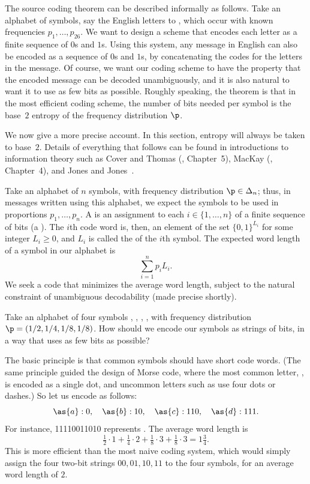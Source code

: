 The source%
% 
% 
coding theorem can be described informally as follows.  Take an alphabet of
symbols, say the English%
%
% 
letters  to , which occur with known frequencies $p_1, \ldots,
p_{26}$.  We want to design a scheme that encodes each letter as a finite
sequence of $0$s and $1$s.  Using this system, any message in English can
also be encoded as a sequence of $0$s and $1$s, by concatenating the codes
for the letters in the message.  Of course, we want our coding scheme to
have the property that the encoded message can be decoded unambiguously,
and it is also natural to want it to use as few bits as possible.  Roughly
speaking, the theorem is that in the most efficient coding scheme, the
number of bits needed per symbol is the base~$2$ entropy of the frequency
distribution $\p$.

We now give a more precise account.  In this section, entropy will always
be taken to base~$2$.  Details of everything that follows can be found in
introductions to information theory such as Cover and Thomas (\cite{CoTh1},
Chapter~5), MacKay (\cite{MacKITI}, Chapter~4), and Jones and
Jones~\cite{JoJo}.

Take an alphabet of $n$ symbols, with frequency distribution $\p \in
\Delta_n$; thus, in messages written using this alphabet, we expect the
symbols to be used in proportions $p_1, \ldots, p_n$.  A
 is an assignment to each $i \in \{1, \ldots, n\}$
of a finite sequence of bits (a ).  The $i$th code word
is, then, an element of the set $\{0, 1\}^{L_i}$ for some integer $L_i \geq
0$, and $L_i$ is called the  of the $i$th symbol.  The expected word length of a symbol in our
alphabet is
\[
\sum_{i = 1}^n p_i L_i.
\]
We seek a code that minimizes the average word length, subject to the
natural constraint of unambiguous decodability (made precise shortly).

\begin{example}
Take an alphabet of four symbols , , , , with
frequency distribution $\p = (1/2, 1/4, 1/8, 1/8)$.  How should we encode
our symbols as strings of bits, in a way that uses as few bits as possible?

The basic principle is that common symbols should have short code words.
(The same principle guided the design of Morse%
%
% 
code, where the most common letter, , is encoded as a single dot, and
uncommon letters such as  use four dots or dashes.)  So let us encode
as follows:
\[
\as{a}: 0,
\quad
\as{b}: 10,
\quad
\as{c}: 110,
\quad
\as{d}: 111.
\]
For instance, 11110011010 represents .  The average word length
is
\[
\tfrac{1}{2} \cdot 1 +
\tfrac{1}{4} \cdot 2 + 
\tfrac{1}{8} \cdot 3 + 
\tfrac{1}{8} \cdot 3
=
1\tfrac{3}{4}.
\]
This is more efficient than the most naive coding system, which would
simply assign the four two-bit strings $00, 01, 10, 11$ to the four
symbols, for an average word length of $2$. 
\end{example}

